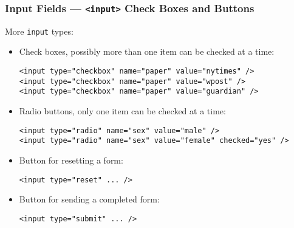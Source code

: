 \documentclass[dvipsnames,handout]{beamer}
\begin{document}
\begin{frame}[fragile]
\frametitle{Input Fields --- \texttt{<input>} Check Boxes and Buttons }
  
  More \texttt{input} types:

\begin{itemize}
\item Check boxes, possibly more
  than one item can be checked at a time:
  \begin{small}
\begin{verbatim}
<input type="checkbox" name="paper" value="nytimes" /> 
<input type="checkbox" name="paper" value="wpost" />
<input type="checkbox" name="paper" value="guardian" />
\end{verbatim}  
  \end{small}

\item Radio buttons, only one item can be checked at a time:
  \begin{footnotesize}
\begin{verbatim}
<input type="radio" name="sex" value="male" />
<input type="radio" name="sex" value="female" checked="yes" />
\end{verbatim}
  \end{footnotesize}
\item Button for resetting a form:
  \begin{small}
\begin{verbatim}
<input type="reset" ... />
\end{verbatim}
  \end{small}
\item Button for sending a completed form:
  \begin{small}
\begin{verbatim}
<input type="submit" ... />
\end{verbatim}
  \end{small}
\end{itemize}
\end{frame}
\end{document}
